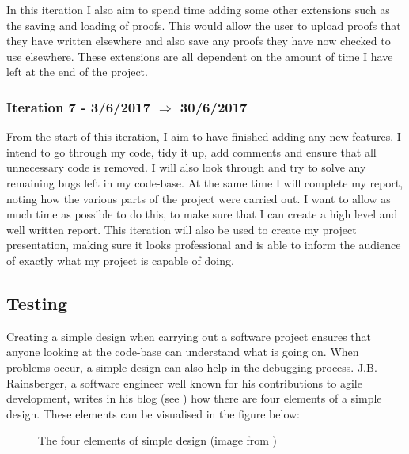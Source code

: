 In this iteration I also aim to spend time adding some other extensions such as the saving and loading of proofs. This would allow the user to upload proofs that they have written elsewhere and also save any proofs they have now checked to use elsewhere. These extensions are all dependent on the amount of time I have left at the end of the project.

\subsubsection{Iteration 7 - 3/6/2017 $\Rightarrow$ 30/6/2017}

From the start of this iteration, I aim to have finished adding any new features. I intend to go through my code, tidy it up, add comments and ensure that all unnecessary code is removed. I will also look through and try to solve any remaining bugs left in my code-base. At the same time I will complete my report, noting how the various parts of the project were carried out. I want to allow as much time as possible to do this, to make sure that I can create a high level and well written report. This iteration will also be used to create my project presentation, making sure it looks professional and is able to inform the audience of exactly what my project is capable of doing.

\subsection{Testing \label{testing}}
Creating a simple design when carrying out a software project ensures that anyone looking at the code-base can understand what is going on. When problems occur, a simple design can also help in the debugging process. J.B. Rainsberger, a software engineer well known for his contributions to agile development, writes in his blog (see \cite{jBrains}) how there are four elements of a simple design. These elements can be visualised in the figure below:

\begin{figure}[!ht]
	\centering
	\caption{The four elements of simple design (image from \cite{SED})}
\end{figure}

